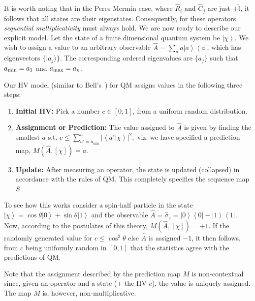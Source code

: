 \documentclass[british,aps,prl,superscriptaddress,nofootinbib,times,reprint]{revtex4-1}
\theoremstyle{plain}
\theoremstyle{plain}
\theoremstyle{definition}
\theoremstyle{remark}
\theoremstyle{remark}
\theoremstyle{remark}
\theoremstyle{plain}
\theoremstyle{plain}
\theoremstyle{plain}
\theoremstyle{definition}
\theoremstyle{definition}
\begin{document}
It is worth noting that in the Peres Mermin
case, where $\hat{R}_{i}$ and $\hat{C}_{j}$ are
just $\pm\hat{\mathbb{I}}$, it follows that all
states are their eigenstates. Consequently, for
these operators \emph{sequential multiplicativity}
must always hold.
We are now ready to describe our explicit model.
Let the state of a finite dimensional quantum system
be $\left|\chi\right\rangle $. We wish to
assign a value to an arbitrary observable 
$\hat{A}=\sum_{a}a\left|a\right\rangle
\left\langle a\right|$, which has 
eigenvectors $\{ \vert
a_j\rangle \}$. The corresponding ordered eigenvalues are $\{a_j\}$ such that 
$a_{\rm min}=a_1$
and 
$a_{\rm max}=a_n$.

Our HV model (similar to Bell's~\cite{BellSpkblUnspkbl}) for QM assigns values in the following
three steps:
\setdefaultleftmargin{0pt}{}{}{}{}{}
\begin{enumerate}
\item
{\bf Initial HV:} Pick a number
$c\in[0,1]$, from a uniform random distribution.\
\item
{\bf
Assignment or Prediction:}
 The value assigned to
$\hat{A}$ is given by finding the smallest $a$
s.t.  $c\le\sum_{a'=a_{\text{min}}}^{a}\left|\left\langle
a'|\chi\right\rangle \right|^{2},$ viz. we have
specified a prediction map, $M(\hat{A},[\chi ])=a$.
\item
{\bf Update:} After measuring an operator, the state is
updated (collapsed) in accordance with the rules
of QM. This completely specifies the sequence map
$S$.
\end{enumerate}
To see how this works consider 
a spin-half particle in the state
$\left|\chi\right\rangle
=\cos\theta\left|0\right\rangle
+\sin\theta\left|1\right\rangle $ and the observable
$\hat{A}=\hat{\sigma}_{z}=\left|0\right\rangle
\left\langle 0\right|-\left|1\right\rangle
\left\langle 1\right|$. Now, according to the
postulates of this theory, $M(\hat{A},[\chi])=+1$.
If
the randomly generated value for 
$c\le\cos^{2}\theta$ else $\hat{A}$ is assigned
$-1$, it then follows,  from $c$ being uniformly
random in $[0,1]$ that the statistics agree with
the predictions of QM.

Note that the assignment described by the
prediction map $M$ is non-contextual since, given
an operator and a state (+ the HV $c$), the value is
uniquely assigned. The map $M$ is, however,
non-multiplicative. 
\end{document}
